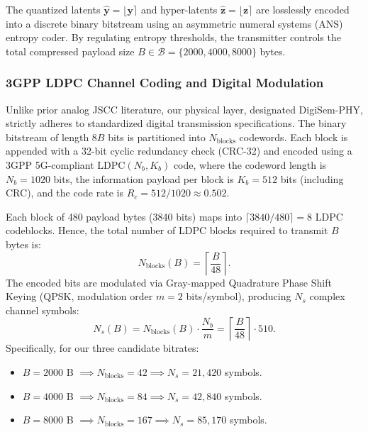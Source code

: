 The quantized latents $\mathbf{\hat y} = \lfloor \mathbf{y} \rceil$ and hyper-latents $\mathbf{\hat z} = \lfloor \mathbf{z} \rceil$ are losslessly encoded into a discrete binary bitstream using an asymmetric numeral systems (ANS) entropy coder. By regulating entropy thresholds, the transmitter controls the total compressed payload size $B \in \mathcal{B} = \{2000, 4000, 8000\}$ bytes.

\subsubsection{3GPP LDPC Channel Coding and Digital Modulation}
Unlike prior analog JSCC literature, our physical layer, designated DigiSem-PHY, strictly adheres to standardized digital transmission specifications. The binary bitstream of length $8B$ bits is partitioned into $N_{\mathrm{blocks}}$ codewords. Each block is appended with a 32-bit cyclic redundancy check (CRC-32) and encoded using a 3GPP 5G-compliant $\text{LDPC}(N_b, K_b)$ code, where the codeword length is $N_b = 1020$ bits, the information payload per block is $K_b = 512$ bits (including CRC), and the code rate is $R_c = 512/1020 \approx 0.502$.

Each block of 480 payload bytes (3840 bits) maps into $\lceil 3840 / 480 \rceil = 8$ LDPC codeblocks. Hence, the total number of LDPC blocks required to transmit $B$ bytes is:
\begin{equation}
N_{\mathrm{blocks}}(B) = \left\lceil \frac{B}{48} \right\rceil.
\end{equation}
The encoded bits are modulated via Gray-mapped Quadrature Phase Shift Keying (QPSK, modulation order $m=2$ bits/symbol), producing $N_s$ complex channel symbols:
\begin{equation}
N_s(B) = N_{\mathrm{blocks}}(B) \cdot \frac{N_b}{m} = \left\lceil \frac{B}{48} \right\rceil \cdot 510.
\end{equation}
Specifically, for our three candidate bitrates:
\begin{itemize}
    \item $B = 2000$ B $\implies N_{\mathrm{blocks}} = 42 \implies N_s = 21{,}420$ symbols.
    \item $B = 4000$ B $\implies N_{\mathrm{blocks}} = 84 \implies N_s = 42{,}840$ symbols.
    \item $B = 8000$ B $\implies N_{\mathrm{blocks}} = 167 \implies N_s = 85{,}170$ symbols.
\end{itemize}

